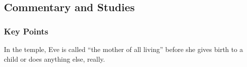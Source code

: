 

	
	
	
	
\subsection{Commentary and Studies} %
	\label{EVE-COMMENTARY}

	\subsubsection{Key Points}
		\label{EVE-KEYS}
	
		\begin{compactitem}
			\item In the temple, Eve is called ``the mother of all living'' before she gives birth to a child or does anything else, really.
		\end{compactitem}
		
